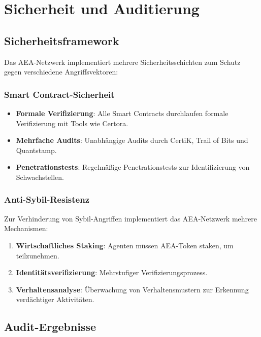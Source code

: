 \documentclass[12pt,a4paper]{article}
\begin{document}
\section{Sicherheit und Auditierung}

\subsection{Sicherheitsframework}

Das AEA-Netzwerk implementiert mehrere Sicherheitsschichten zum Schutz gegen verschiedene Angriffsvektoren:

\subsubsection{Smart Contract-Sicherheit}

\begin{itemize}
\item \textbf{Formale Verifizierung}: Alle Smart Contracts durchlaufen formale Verifizierung mit Tools wie Certora.
\item \textbf{Mehrfache Audits}: Unabhängige Audits durch CertiK, Trail of Bits und Quantstamp.
\item \textbf{Penetrationstests}: Regelmäßige Penetrationstests zur Identifizierung von Schwachstellen.
\end{itemize}

\subsubsection{Anti-Sybil-Resistenz}

Zur Verhinderung von Sybil-Angriffen implementiert das AEA-Netzwerk mehrere Mechanismen:

\begin{enumerate}
\item \textbf{Wirtschaftliches Staking}: Agenten müssen AEA-Token staken, um teilzunehmen.
\item \textbf{Identitätsverifizierung}: Mehrstufiger Verifizierungsprozess.
\item \textbf{Verhaltensanalyse}: Überwachung von Verhaltensmustern zur Erkennung verdächtiger Aktivitäten.
\end{enumerate}

\subsection{Audit-Ergebnisse}
\end{document}

